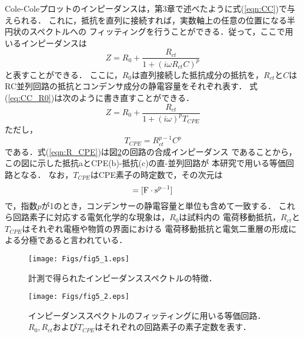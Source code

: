 Cole-Coleプロットのインピーダンスは，第3章で述べたように式(\ref{eqn:CC})で与えられる．
これに，抵抗を直列に接続すれば，実数軸上の任意の位置になる半円状のスペクトルへの
フィッティングを行うことができる．従って，ここで用いるインピーダンスは
\begin{equation}
	Z=R_0 +\frac{R_{ct}}{1+\left( i\omega R_{ct}C\right)^p}
	\label{eqn:CC_R0}
\end{equation}
と表すことができる．
ここに，$R_0$は直列接続した抵抗成分の抵抗を，$R_{ct}$と$C$は
RC並列回路の抵抗とコンデンサ成分の静電容量をそれぞれ表す．
式(\ref{eq:CC_R0})は次のように書き直すことができる．
\begin{equation}
	Z=R_0 +\frac{R_{ct}}{1+\left( i\omega \right)^pT_{CPE}}
	\label{eqn:R_CPE}
\end{equation}
ただし，
\begin{equation}
	T_{CPE}=R_{ct}^{p-1}C^{p}
	\label{eqn:T_CPE}
\end{equation}
である．式(\ref{eqn:R_CPE})は図\ref{fig:fig5_2}の回路の合成インピーダンス
であることから，この図に示した抵抗aとCPE(b)-抵抗(c)の直-並列回路が
本研究で用いる等価回路となる．
なお，$T_{CPE}$はCPE素子の時定数で，その次元は
\begin{equation}
	[T_{CPE}] ={\rm [ F\cdot s^{p-1}]}
	\label{eqn:}
\end{equation}
で，指数$p$が1のとき，コンデンサーの静電容量と単位も含めて一致する．
これら回路素子に対応する電気化学的な現象は，$R_0$は試料内の
電荷移動抵抗，$R_{ct}$と$T_{CPE}$はそれぞれ電極や物質の界面における
電荷移動抵抗と電気二重層の形成による分極であると言われている．
\begin{figure}[h]
	\begin{center}
	\texttt{[image: Figs/fig5\_1.eps]} 
	\end{center}
	\caption{
		計測で得られたインピーダンススペクトルの特徴．	
	} 
	\label{fig:fig5_1}
\end{figure}
\begin{figure}[h]
	\begin{center}
	\texttt{[image: Figs/fig5\_2.eps]} 
	\end{center}
	\caption{
		インピーダンススペクトルのフィッティングに用いる等価回路．
		$R_0,R_{ct}$および$T_{CPE}$はそれぞれの回路素子の素子定数を表す．
	} 
	\label{fig:fig5_2}
\end{figure}

